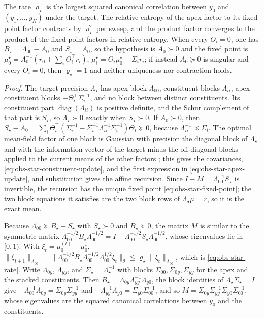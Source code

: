 The rate \(\varrho_\star\) is the largest squared canonical correlation between \(y_0\) and
\((y_1,\dots,y_N)\) under the target. The relative entropy of the apex factor to its
fixed-point factor contracts by \(\varrho_\star^2\) per sweep, and the product factor
converges to the product of the fixed-point factors in relative entropy. When every
\(O_i=0\), one has \(B_\star=\Lambda_{00}-A_0\) and \(S_\star=A_0\), so the hypothesis is
\(A_0\succ0\) and the fixed point is
\(\mu_0^\star=A_0^{-1}(r_0+\sum_i\Theta_i^\top r_i)\), \(\mu_i^\star=\Theta_i\mu_0^\star+\Sigma_ir_i\);
if instead \(A_0\succeq0\) is singular and every \(O_i=0\), then \(\varrho_\star=1\) and
neither uniqueness nor contraction holds. 

\noindent\emph{Proof.}
The target precision \(\Lambda_\star\) has apex block \(\Lambda_{00}\), constituent blocks
\(\Lambda_{ii}\), apex-constituent blocks \(-\Theta_i^\top\Sigma_i^{-1}\), and no block between
distinct constituents. Its constituent part \(\operatorname{diag}(\Lambda_{ii})\) is positive
definite, and the Schur complement of that part is \(S_\star\), so \(\Lambda_\star\succ0\)
exactly when \(S_\star\succ0\). If \(A_0\succ0\), then
\(S_\star-A_0=\sum_i\Theta_i^\top(\Sigma_i^{-1}-\Sigma_i^{-1}\Lambda_{ii}^{-1}\Sigma_i^{-1})\Theta_i\succeq0\),
because \(\Lambda_{ii}^{-1}\preceq\Sigma_i\). The optimal mean-field factor of one block is
Gaussian with precision the diagonal block of \(\Lambda_\star\) and with the information
vector of the target minus the off-diagonal blocks applied to the current means of the
other factors \citep[Secs.~10.1.1--10.1.2]{Bishop2006}; this gives the covariances,
\eqref{eq:obs-star-constituent-update}, and the first expression in
\eqref{eq:obs-star-apex-update}, and substitution gives the affine recursion. Since
\(I-M=\Lambda_{00}^{-1}S_\star\) is invertible, the recursion has the unique fixed point
\eqref{eq:obs-star-fixed-point}; the two block equations it satisfies are the two block rows
of \(\Lambda_\star\mu=r\), so it is the exact mean.

Because \(\Lambda_{00}\succeq B_\star+S_\star\) with \(S_\star\succ0\) and \(B_\star\succeq0\), the matrix
\(M\) is similar to the symmetric matrix
\(\Lambda_{00}^{-1/2}B_\star\Lambda_{00}^{-1/2}=I-\Lambda_{00}^{-1/2}S_\star\Lambda_{00}^{-1/2}\), whose
eigenvalues lie in \([0,1)\). With \(\xi_t=\mu_0^{(t)}-\mu_0^\star\),
\(\lVert\xi_{t+1}\rVert_{\Lambda_{00}}=\lVert\Lambda_{00}^{-1/2}B_\star\Lambda_{00}^{-1/2}\Lambda_{00}^{1/2}\xi_t\rVert_2
\leq\varrho_\star\lVert\xi_t\rVert_{\Lambda_{00}}\), which is \eqref{eq:obs-star-rate}. Write
\(\Lambda_{0y}\), \(\Lambda_{yy}\), and \(\Sigma_\star=\Lambda_\star^{-1}\) with blocks
\(\Sigma_{00},\Sigma_{0y},\Sigma_{yy}\) for the apex and the stacked constituents. Then
\(B_\star=\Lambda_{0y}\Lambda_{yy}^{-1}\Lambda_{y0}\), the block identities of
\(\Lambda_\star\Sigma_\star=I\) give \(-\Lambda_{00}^{-1}\Lambda_{0y}=\Sigma_{0y}\Sigma_{yy}^{-1}\) and
\(-\Lambda_{yy}^{-1}\Lambda_{y0}=\Sigma_{y0}\Sigma_{00}^{-1}\), and so
\(M=\Sigma_{0y}\Sigma_{yy}^{-1}\Sigma_{y0}\Sigma_{00}^{-1}\), whose eigenvalues are the squared
canonical correlations between \(y_0\) and the constituents.

